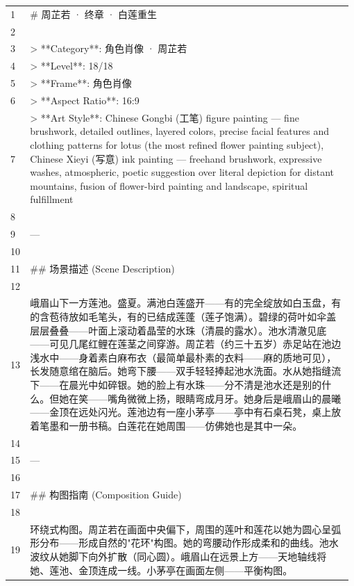 \begingroup
\setlength{\tabcolsep}{0pt}
\renewcommand{\arraystretch}{1.08}
\setlength{\emergencystretch}{3em}
\begin{longtable}{@{}>{\RaggedLeft\arraybackslash\footnotesize}p{0.04\linewidth}@{\hspace{0.8em}}>{\RaggedRight\arraybackslash\ttfamily\scriptsize}p{0.935\linewidth}@{}}
1 & \# 周芷若 · 终章 · 白莲重生\\
2 & \mbox{}\\
3 & > **Category**: 角色肖像 · 周芷若\\
4 & > **Level**: 18/18\\
5 & > **Frame**: 角色肖像\\
6 & > **Aspect Ratio**: 16:9\\
7 & > **Art Style**: Chinese Gongbi (工笔) figure painting — fine brushwork, detailed outlines, layered colors, precise facial features and clothing patterns for lotus (the most refined flower painting subject), Chinese Xieyi (写意) ink painting — freehand brushwork, expressive washes, atmospheric, poetic suggestion over literal depiction for distant mountains, fusion of flower-bird painting and landscape, spiritual fulfillment\\
8 & \mbox{}\\
9 & ---\\
10 & \mbox{}\\
11 & \#\# \promptemoji{📖} 场景描述 (Scene Description)\\
12 & \mbox{}\\
13 & 峨眉山下一方莲池。盛夏。满池白莲盛开——有的完全绽放如白玉盘，有的含苞待放如毛笔头，有的已结成莲蓬（莲子饱满）。碧绿的荷叶如伞盖层层叠叠——叶面上滚动着晶莹的水珠（清晨的露水）。池水清澈见底——可见几尾红鲤在莲茎之间穿游。周芷若（约三十五岁）赤足站在池边浅水中——身着素白麻布衣（最简单最朴素的衣料——麻的质地可见），长发随意绾在脑后。她弯下腰——双手轻轻捧起池水洗面。水从她指缝流下——在晨光中如碎银。她的脸上有水珠——分不清是池水还是别的什么。但她在笑——嘴角微微上扬，眼睛弯成月牙。她身后是峨眉山的晨曦——金顶在远处闪光。莲池边有一座小茅亭——亭中有石桌石凳，桌上放着笔墨和一册书稿。白莲花在她周围——仿佛她也是其中一朵。\\
14 & \mbox{}\\
15 & ---\\
16 & \mbox{}\\
17 & \#\# \promptemoji{🖼} 构图指南 (Composition Guide)\\
18 & \mbox{}\\
19 & 环绕式构图。周芷若在画面中央偏下，周围的莲叶和莲花以她为圆心呈弧形分布——形成自然的"花环"构图。她的弯腰动作形成柔和的曲线。池水波纹从她脚下向外扩散（同心圆）。峨眉山在远景上方——天地轴线将她、莲池、金顶连成一线。小茅亭在画面左侧——平衡构图。\\

\end{longtable}
